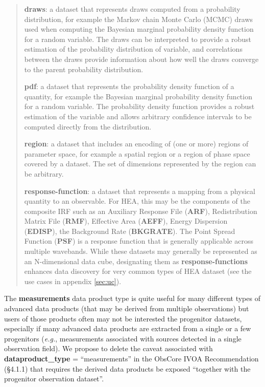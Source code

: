 \documentclass[11pt,a4paper]{ivoa}
\begin{document}
\begin{quote}
{\bf draws}: a dataset that represents draws computed from a probability distribution, for example the Markov chain Monte Carlo (MCMC) draws used when computing the Bayesian marginal probability density function for a random variable. The draws
can be interpreted to provide a robust estimation of the probability distribution of variable, and correlations between the draws provide information about how well the draws converge to the parent probability distribution.

{\bf pdf}: a dataset that represents the probability density function of a quantity, for example the Bayesian marginal probability density  function for a random variable. The probability density function provides a robust estimation of the variable and allows arbitrary confidence intervals to be computed directly from the distribution.

{\bf region}: a dataset that includes an encoding of (one or more) regions of parameter space, for example a spatial region or a region of phase space covered by a dataset. The set of dimensions represented by the region can be arbitrary.

{\bf response-function}: a dataset that represents a mapping from a physical quantity to an observable. For \gls{HEA}, this may be the components of the composite \gls{IRF} such as an Auxiliary Response File ({\bf ARF}), Redistribution Matrix File ({\bf RMF}), Effective Area ({\bf AEFF}), Energy Dispersion ({\bf EDISP}), the Background Rate ({\bf BKGRATE}). The Point Spread Function ({\bf PSF}) is a response function that is generally applicable across multiple wavebands. While these datasets may generally be represented as an N-dimensional data cube, designating them as {\bf response-functions} enhances data discovery for very common types of \gls{HEA} dataset (see the use cases in appendix \ref{sec:uc}).

\end{quote}

The {\bf measurements} data product type is quite useful for many different types of advanced data products (that may be derived from multiple observations) but users of those products often may not be interested the progenitor datasets, especially if many advanced data products are extracted from a single or a few progenitors ({\em e.g.\/}, measurements associated with sources detected in a single observation field). We propose to delete the caveat associated with {\bf dataproduct\_type} = ``measurements'' in the ObsCore IVOA Recommendation (\S4.1.1) that requires the derived data products be exposed ``together with the progenitor observation dataset''.
\end{document}
